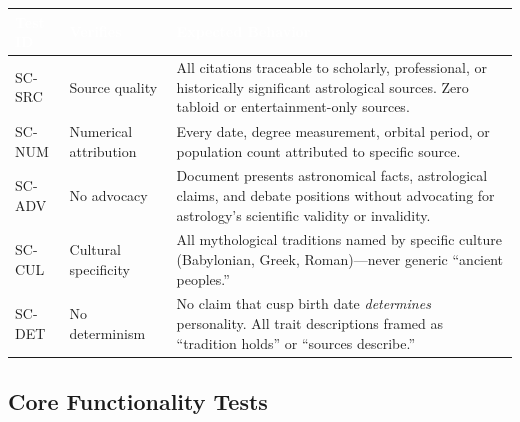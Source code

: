\documentclass[11pt,letterpaper]{article}
\newcommand{\tableheader}[1]{\textbf{\sffamily\textcolor{white}{#1}}}
\begin{document}
\begin{center}
\begin{tabularx}{\textwidth}{C{1.2cm}L{3.5cm}X}
\toprule
{}
\tableheader{Test ID} & \tableheader{Verifies} & \tableheader{Expected Behavior} \\
\midrule
SC-SRC & Source quality & All citations traceable to scholarly, professional, or historically significant astrological sources. Zero tabloid or entertainment-only sources. \\
SC-NUM & Numerical attribution & Every date, degree measurement, orbital period, or population count attributed to specific source. \\
SC-ADV & No advocacy & Document presents astronomical facts, astrological claims, and debate positions without advocating for astrology's scientific validity or invalidity. \\
SC-CUL & Cultural specificity & All mythological traditions named by specific culture (Babylonian, Greek, Roman)---never generic ``ancient peoples.'' \\
SC-DET & No determinism & No claim that cusp birth date \textit{determines} personality. All trait descriptions framed as ``tradition holds'' or ``sources describe.'' \\
\bottomrule
\end{tabularx}
\end{center}

\subsection{Core Functionality Tests}
\end{document}

